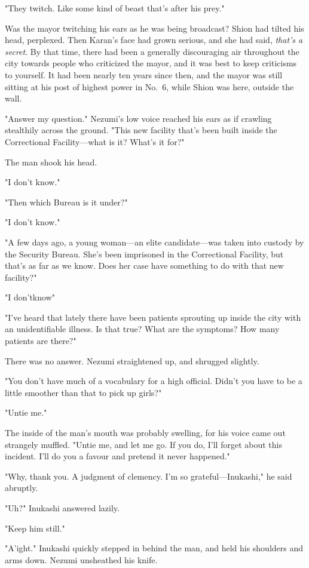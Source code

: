 "They twitch. Like some kind of beast that's after his prey."

Was the mayor twitching his ears as he was being broadcast? Shion had
tilted his head, perplexed. Then Karan's face had grown serious, and she
had said, \emph{that's a secret}. By that time, there had been a generally
discouraging air throughout the city towards people who criticized the
mayor, and it was best to keep criticisms to yourself. It had been
nearly ten years since then, and the mayor was still sitting at his post
of highest power in No.~6, while Shion was here, outside the wall.

"Answer my question." Nezumi's low voice reached his ears as if crawling
stealthily across the ground. "This new facility that's been built
inside the Correctional Facility---what is it? What's it for?"

The man shook his head.

"I don't know."

"Then which Bureau is it under?"

"I don't know."

"A few days ago, a young woman---an elite candidate---was taken into custody
by the Security Bureau. She's been imprisoned in the Correctional
Facility, but that's as far as we know. Does her case have something to
do with that new facility?"

"I don't\el know\el "

"I've heard that lately there have been patients sprouting up inside the
city with an unidentifiable illness. Is that true? What are the
symptoms? How many patients are there?"

There was no answer. Nezumi straightened up, and shrugged slightly.

"You don't have much of a vocabulary for a high official. Didn't you
have to be a little smoother than that to pick up girls?"

"Untie me."

The inside of the man's mouth was probably swelling, for his voice came
out strangely muffled. "Untie me, and let me go. If you do, I'll forget
about this incident. I'll do you a favour and pretend it never
happened."

"Why, thank you. A judgment of clemency. I'm so grateful---Inukashi," he
said abruptly.

"Uh?" Inukashi answered lazily.

"Keep him still."

"A'ight." Inukashi quickly stepped in behind the man, and held his
shoulders and arms down. Nezumi unsheathed his knife.

